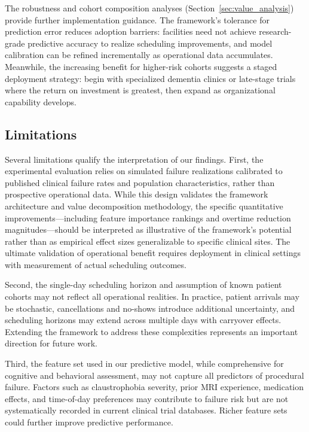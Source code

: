 \documentclass[11pt,a4paper]{article}
\begin{document}
The robustness and cohort composition analyses (Section~\ref{sec:value_analysis}) provide further implementation guidance. The framework's tolerance for prediction error reduces adoption barriers: facilities need not achieve research-grade predictive accuracy to realize scheduling improvements, and model calibration can be refined incrementally as operational data accumulates. Meanwhile, the increasing benefit for higher-risk cohorts suggests a staged deployment strategy: begin with specialized dementia clinics or late-stage trials where the return on investment is greatest, then expand as organizational capability develops.

\subsection{Limitations}

Several limitations qualify the interpretation of our findings. First, the experimental evaluation relies on simulated failure realizations calibrated to published clinical failure rates and population characteristics, rather than prospective operational data. While this design validates the framework architecture and value decomposition methodology, the specific quantitative improvements---including feature importance rankings and overtime reduction magnitudes---should be interpreted as illustrative of the framework's potential rather than as empirical effect sizes generalizable to specific clinical sites. The ultimate validation of operational benefit requires deployment in clinical settings with measurement of actual scheduling outcomes.

Second, the single-day scheduling horizon and assumption of known patient cohorts may not reflect all operational realities. In practice, patient arrivals may be stochastic, cancellations and no-shows introduce additional uncertainty, and scheduling horizons may extend across multiple days with carryover effects. Extending the framework to address these complexities represents an important direction for future work.

Third, the feature set used in our predictive model, while comprehensive for cognitive and behavioral assessment, may not capture all predictors of procedural failure. Factors such as claustrophobia severity, prior MRI experience, medication effects, and time-of-day preferences may contribute to failure risk but are not systematically recorded in current clinical trial databases. Richer feature sets could further improve predictive performance.
\end{document}
